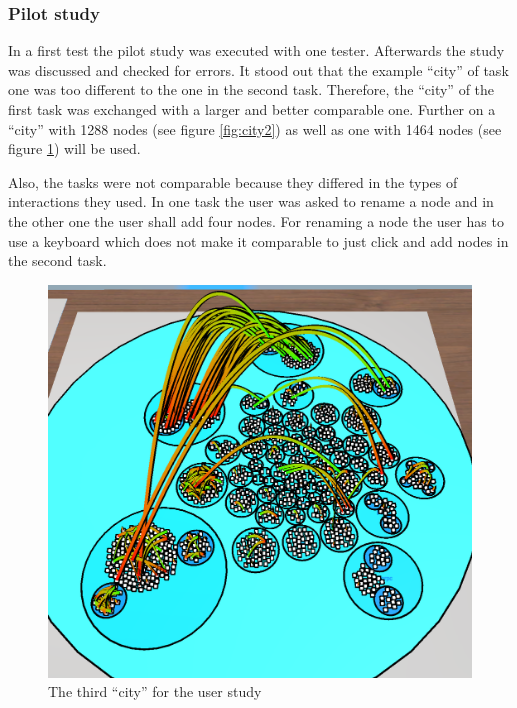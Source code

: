 \subsubsection{Pilot study}
In a first test the pilot study was executed with one tester. 
Afterwards the study was discussed and checked for errors. 
It stood out that the example \enquote{\gls{city}} of task one was too different to the one in the second task.
Therefore, the \enquote{\gls{city}} of the first task was exchanged with a larger and better comparable one.
Further on a \enquote{\gls{city}} with 1288 nodes (see figure \ref{fig:city2}) as well as one with 1464 nodes (see figure \ref{fig:city3}) will be used.

Also, the tasks were not comparable because they differed in the types of interactions they used.
In one task the user was asked to rename a node and in the other one the user shall add four nodes.
For renaming a node the user has to use a keyboard which does not make it comparable to just click and add nodes in the second task.


\begin{figure}[htb]
    \centering
    \includegraphics[width=1\textwidth]{Evaluation/img/city_3.png}
    \caption{The third \enquote{\gls{city}} for the user study}\label{fig:city3}
\end{figure}

